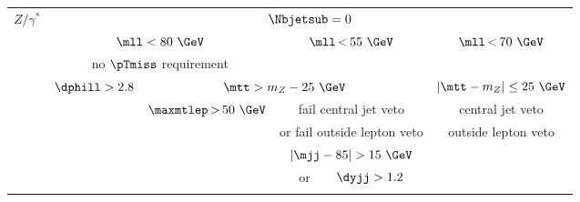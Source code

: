 \begin{tabular}{c|| c | c | c | c}
    \hline\hline
    \multirow{8}{*}{$Z/\gamma^{\ast}$}  & \multicolumn{4}{c}{\phantom{ccccc}$\Nbjetsub=0$}                                                                                                                                       \\ \cline{2-5}
                                        & \multicolumn{2}{c|}{\phantom{ccccc}$\mll < 80~\GeV$} & $\mll\,{<}\,55~\GeV$                                          & $\mll\,{<}\,70~\GeV$                                            \\\
                                        & \multicolumn{2}{c|}{no $\pTmiss$ requirement}        &                                                               &                                                                 \\\cline{2-4}
                                        & $\dphill > 2.8$                                      & \multicolumn{2}{c|}{$\mtt > m_Z - 25~\GeV$}                   & $|\mtt - m_Z| \leq 25~\GeV$                                     \\ \cline{3-4}
                                        &                                                      & $\maxmtlep\,{>}\,50~\GeV$                                     & fail central jet veto          & central jet veto               \\
                                        &                                                      &                                                               & or fail outside lepton veto    & outside lepton veto            \\ \cline{4-4}
                                        &                                                      &                                                               & $|\mjj-85| > 15~\GeV$          &                                \\
                                        &                                                      &                                                               & or\ \ \ \ $\dyjj > 1.2$        &                                \\
    \dbline
\end{tabular}
